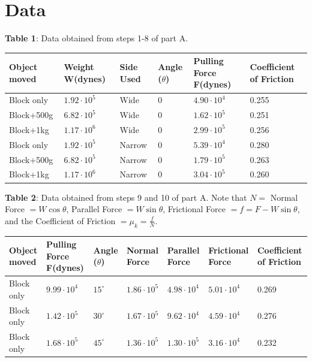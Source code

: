 \documentclass{article}
\theoremstyle{definition}
\begin{document}
\section{Data}
\textbf{Table 1}: Data obtained from steps 1-8 of part A.
\begin{center}
    \begin{tabular}{|m{5em} | m{1.9cm} | m{1cm} | m{1cm} | m{2.05cm} | m{1.8cm}|} 
    \hline
    Object moved & Weight W(dynes) & Side Used & Angle ($\theta$) & Pulling Force F(dynes) & Coefficient of Friction\\ 
    \hline\hline
    Block only & $1.92 \cdot 10^5$ & Wide & 0 & $4.90 \cdot 10^4$ & 0.255 \\ 
    \hline
    Block+500g & $6.82 \cdot 10^5$ & Wide & 0 & $1.62 \cdot 10^5$ & 0.251 \\ 
    \hline
    Block+1kg & $1.17 \cdot 10^6$ & Wide & 0 & $2.99 \cdot 10^5$ & 0.256 \\ 
    \hline
    Block only & $1.92 \cdot 10^5$ & Narrow & 0 & $5.39 \cdot 10^4$ & 0.280 \\ 
    \hline
    Block+500g & $6.82 \cdot 10^5$ & Narrow & 0 & $1.79 \cdot 10^5$ & 0.263 \\ 
    \hline
    Block+1kg & $1.17 \cdot 10^6$ & Narrow & 0 & $3.04 \cdot 10^5$ & 0.260 \\ 
    \hline
   \end{tabular}
\end{center}
\newpage
\textbf{Table 2}: Data obtained from steps 9 and 10 of part A. Note that $N =$ Normal Force
$= W\cos\theta$, Parallel Force $= W\sin\theta$, Frictional Force $= f = F - W\sin\theta$, and
the Coefficient of Friction $= \mu_k = \frac{f}{N}$. 
\begin{center}
    \begin{tabular}{|m{4em} | m{1.5cm} | m{0.8cm} | m{1.3cm} | m{1.3cm} | m{1.4cm} |m{1.7cm}|} 
    \hline
    Object moved & Pulling Force F(dynes) & Angle ($\theta$) & Normal Force & Parallel Force & Frictional Force & Coefficient of Friction\\ 
    \hline\hline
    Block only & $9.99 \cdot 10^4$ & $15^\circ$ & $1.86 \cdot 10^5$ & $4.98 \cdot 10^4$ & $5.01 \cdot 10^4$ & 0.269\\ 
    \hline
    Block only & $1.42 \cdot 10^5$ & $30^\circ$ & $1.67 \cdot 10^5$ & $9.62 \cdot 10^4$ & $4.59 \cdot 10^4$ & 0.276\\ 
    \hline
    Block only & $1.68 \cdot 10^5$ & $45^\circ$ & $1.36 \cdot 10^5$ & $1.30 \cdot 10^5$ & $3.16 \cdot 10^4$ & 0.232\\ 
    \hline
   \end{tabular}
\end{center}
\end{document}
